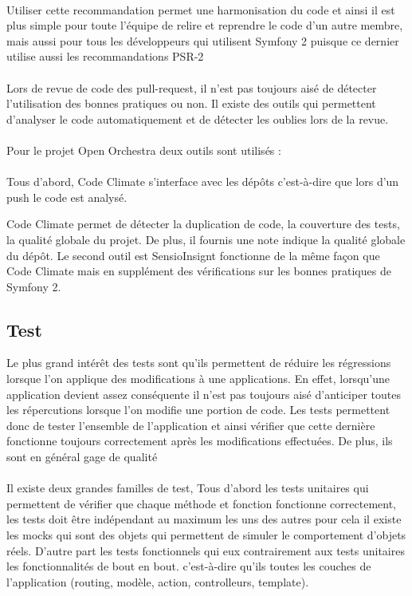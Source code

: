 \paragraph{}
Utiliser cette recommandation permet une harmonisation du code et ainsi il est plus simple pour toute l'équipe de relire et reprendre le code d'un autre membre, mais aussi pour tous les développeurs qui utilisent Symfony 2 puisque ce dernier utilise aussi les recommandations PSR-2
\paragraph{}
Lors de revue de code des pull-request, il n'est pas toujours aisé de détecter l'utilisation des bonnes pratiques ou non. Il existe des outils qui permettent d'analyser le code automatiquement et de détecter les oublies lors de la revue.
\paragraph{}
Pour le projet Open Orchestra deux outils sont utilisés : 
\paragraph{}
Tous d'abord, Code Climate s'interface avec les dépôts c'est-à-dire que lors d'un push le code est analysé.

Code Climate permet de détecter la duplication de code, la couverture des tests, la qualité globale du projet. De plus, il fournis une note indique la qualité globale du dépôt. 
Le second outil est SensioInsignt fonctionne de la même façon que Code Climate mais en supplément des vérifications sur les bonnes pratiques de Symfony 2.
\subsection{Test}
Le plus grand intérêt des tests sont qu'ils permettent de réduire les régressions lorsque l'on applique des modifications à une applications. En effet, lorsqu'une application devient assez conséquente il n'est pas toujours aisé d'anticiper toutes les répercutions lorsque l'on modifie une portion de code. Les tests permettent donc de tester l'ensemble de l'application et ainsi vérifier que cette dernière fonctionne toujours correctement après les modifications effectuées. 
De plus, ils sont en général gage de qualité
 \paragraph{}
 Il existe deux grandes familles de test, Tous d'abord les tests unitaires qui permettent de vérifier que chaque méthode et fonction fonctionne correctement, les tests doit être indépendant au maximum les uns des autres pour cela il existe les mocks qui sont des objets qui permettent de simuler le comportement d'objets \og{}réels\fg{}.
 D'autre part les tests fonctionnels qui eux contrairement aux tests unitaires les fonctionnalités de bout en bout. c'est-à-dire qu'ils toutes les couches de l'application (routing, modèle, action, controlleurs, template).
